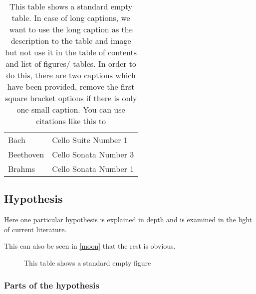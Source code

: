 \begin{table}[h!tb] \centering
    \caption[This table shows a standard non-empty table. Please check the code caption for extended instructions]{This table shows a standard empty table. In case of long captions, we want to use the long caption as the description to the table and image but not use it in the table of contents and list of figures/ tables. In order to do this, there are two captions which have been provided, remove the first square bracket options if there is only one small caption. You can use citations like this to}

    \begin{tabular}{ll}
        Bach            &Cello Suite Number 1  \\
        Beethoven       &Cello Sonata Number 3 \\
        Brahms          &Cello Sonata Number 1
      \end{tabular}
\label{nothing}

\vspace{ 2 in}
\end{table}

\subsection{Hypothesis}

Here one particular hypothesis is explained in depth
and is examined in the light of current literature.

This can also be seen in \autoref{moon} that the
rest is obvious.

\begin{figure}[h!tb] \centering

\vspace{ 2 in}
\caption{This table shows a standard empty figure}
\label{moon}
\end{figure}

\subsubsection{Parts of the hypothesis}

